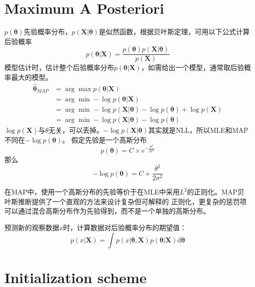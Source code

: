 \section{Maximum A Posteriori}
$p(\boldsymbol{\theta})$先验概率分布，$p(\mathbf{X}|\boldsymbol{\theta})$是似然函数，根据贝叶斯定理，可用以下公式计算后验概率
\begin{equation}
    p(\boldsymbol{\theta} | \mathbf{X}) = \frac{p(\boldsymbol{\theta})p(\mathbf{X}|\boldsymbol{\theta})}{p(\mathbf{X})}
\end{equation}
模型估计时，估计整个后验概率分布$p(\boldsymbol{\theta} | \mathbf{X})$，如需给出一个模型，通常取后验概率最大的模型。
\begin{equation}
    \begin{split}
        \hat{\boldsymbol{\theta}}_{MAP} &= \arg \max p(\boldsymbol{\theta} | \mathbf{X}) \\
        &= \arg \min -\log p(\boldsymbol{\theta} | \mathbf{X}) \\
        &= \arg \min -\log p(\mathbf{X}|\boldsymbol{\theta}) - \log p(\boldsymbol{\theta}) + \log p(\mathbf{X}) \\
        &= \arg \min -\log p(\mathbf{X}|\boldsymbol{\theta}) - \log p(\boldsymbol{\theta})
    \end{split}
\end{equation}
$\log p(\mathbf{X})$与$\theta$无关，可以丢掉。$-\log p(\mathbf{X}|\boldsymbol{\theta})$其实就是NLL，所以MLE和MAP不同在$- \log p(\boldsymbol{\theta})$。
假定先验是一个高斯分布
\begin{equation}
    p(\boldsymbol{\theta}) = C \times e^{-\frac{\theta^2}{2\sigma^2}}
\end{equation}
那么
\begin{equation}
    -\log p(\boldsymbol{\theta}) = C + \frac{\theta^2}{2\sigma^2}
\end{equation}

在MAP中，使用一个高斯分布的先验等价于在MLE中采用$L^2$的正则化。MAP贝叶斯推断提供了一个直观的方法来设计复杂但可解释的
正则化，更复杂的惩罚项可以通过混合高斯分布作为先验得到，而不是一个单独的高斯分布。


预测新的观察数据$x$时，计算数据对后验概率分布的期望值：
\begin{equation}
    p(x | \mathbf{X}) = \int p(x | \boldsymbol{\theta}, \mathbf{X})p(\boldsymbol{\theta}|\mathbf{X})\mathrm{d}\boldsymbol{\theta}
\end{equation}
\section{Initialization scheme}
